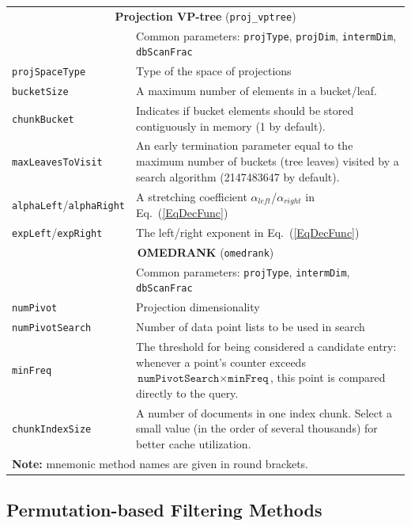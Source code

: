\documentclass[runningheads,a4paper]{llncs}
\newcommand{\ttt}[1]{\texttt{#1}}
\begin{document}
{\begin{table}
\begin{tabular}{l@{\hspace{2mm}}p{3.5in}}
\cmidrule(l){1-2} 
\multicolumn{2}{c}{\textbf{Projection VP-tree} (\ttt{proj\_vptree}) } 
\\
\cmidrule(l){1-2} 
                     & Common parameters: \ttt{projType}, \ttt{projDim}, \ttt{intermDim}, \ttt{dbScanFrac} \\
 \ttt{projSpaceType} & Type of the space of projections                 \\
 \ttt{bucketSize}    & A maximum number of elements in a bucket/leaf.    \\
 \ttt{chunkBucket}   & Indicates if bucket elements should be stored contiguously in memory (1 by default).  \\
 \ttt{maxLeavesToVisit}  & An early termination parameter equal to the maximum number of buckets (tree leaves) visited by a search algorithm (2147483647 by default). \\
 \ttt{alphaLeft}/\ttt{alphaRight}   & A stretching coefficient $\alpha_{left}$/$\alpha_{right}$ in Eq.~(\ref{EqDecFunc}) \\
 \ttt{expLeft}/\ttt{expRight} & The left/right exponent in Eq.~(\ref{EqDecFunc}) \\
\cmidrule(l){1-2} 
\multicolumn{2}{c}{\textbf{OMEDRANK} \cite{Fagin2003} (\ttt{omedrank}) } 
\\
\cmidrule(l){1-2} 
                     & Common parameters: \ttt{projType}, \ttt{intermDim}, \ttt{dbScanFrac} \\
\ttt{numPivot}       & Projection dimensionality \\
\ttt{numPivotSearch} & Number of data point lists to be used in search \\
\ttt{minFreq}        & The threshold for being considered a candidate entry: whenever
                       a point's counter exceeds $\ttt{numPivotSearch}\times\ttt{minFreq}$,
                       this point is compared directly to the query.  \\
\ttt{chunkIndexSize} & A number of documents in one index chunk. Select a small value (in the order of several thousands) for better cache utilization. \\
\bottomrule
\multicolumn{2}{l}{\textbf{Note:} mnemonic method names are given in round brackets.}
\end{tabular}
\vspace{2em}
\end{table}

\subsection{Permutation-based Filtering Methods} \label{SectionPermMethod}

}
\end{document}
